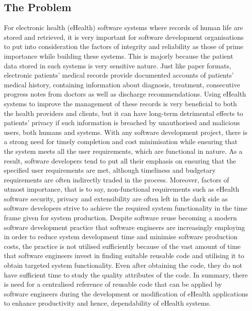 \documentclass[a4paper]{article}
\begin{document}
\subsection{The Problem} \newline
For electronic health (eHealth) software systems where records of human life are stored and retrieved, it is very important for software development organisations to put into consideration the factors of integrity and reliability as those of prime importance while building these systems. This is majorly because the patient data stored in such systems is very sensitive nature. Just like paper formats, electronic patients’ medical records provide documented accounts of patients’ medical history, containing information about diagnosis, treatment, consecutive progress notes from doctors as well as discharge recommendations. Using eHealth systems to improve the management of these records is very beneficial to both the health providers and clients, but it can have long-term detrimental effects to patients’ privacy if such information is breached by unauthorised and malicious users, both humans and systems. With any software development project, there is a strong need for timely completion and cost minimisation while ensuring that the system meets all the user requirements, which are functional in nature. As a result, software developers tend to put all their emphasis on ensuring that the specified user requirements are met, although timeliness and budgetary requirements are often indirectly traded in the process. Moreover, factors of utmost importance, that is to say, non-functional requirements such as eHealth software security, privacy and extensibility are often left in the dark side as software developers strive to achieve the required system functionality in the time frame given for system production. Despite software reuse becoming a modern software development practice that software engineers are increasingly employing in order to reduce system development time and minimise software production costs, the practice is not utilised sufficiently because of the vast amount of time that software engineers invest in finding suitable reusable code and utilising it to obtain targeted system functionality. Even after obtaining the code, they do not have sufficient time to study the quality attributes of the code. In summary, there is need for a centralised reference of reusable code that can be applied by software engineers during the development or modification of eHealth applications to enhance productivity and hence, dependability of eHealth systems.\newline 
\end{document}
